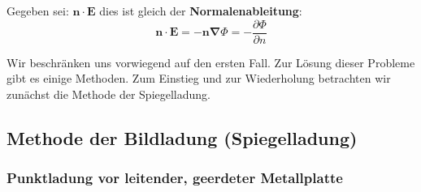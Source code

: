 \documentclass[titlepage,11pt,a4paper,ngerman]{report}
\newcommand{\prt}[2]{\frac{\partial #1}{\partial #2}}
\renewcommand{\Phi}{\varPhi}
\renewcommand{\vec}[1]{\boldsymbol{#1}}
\newcommand{\lcom}[1]{\color{MidnightBlue}#1\color{black}}
\newcommand{\vabla}{\boldsymbol{\nabla}}
\begin{document}
\noindent
\begin{minipage}{.6\linewidth}
	Gegeben sei: $ \vec{n} \cdot \vec{E} $ dies ist gleich der \textbf{Normalenableitung}:
	\begin{equation*}
	\vec{n} \cdot \vec{E} = - \vec{n} \vabla \Phi = - \prt{\Phi}{n}
	\end{equation*}
\end{minipage}
\begin{minipage}{.4\linewidth}
	\centering
	\vspace{5pt}
\end{minipage}
\lcom{Wir beschränken uns vorwiegend auf den ersten Fall. }
\lcom{Zur Lösung dieser Probleme gibt es einige Methoden. Zum Einstieg und zur Wiederholung betrachten wir zunächst die Methode der Spiegelladung. }

\subsection{Methode der Bildladung (Spiegelladung)}

\subsubsection{Punktladung vor leitender, geerdeter Metallplatte}
\end{document}

